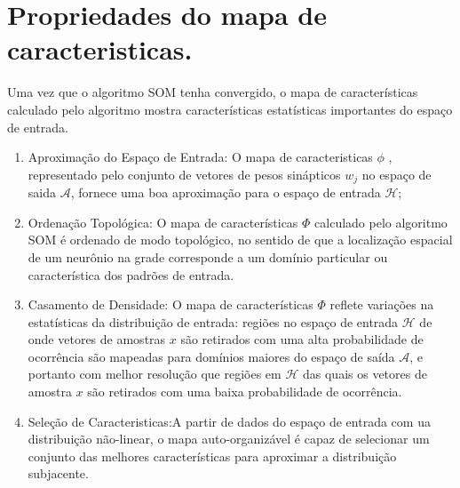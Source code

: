 \section {Propriedades do mapa de caracteristicas.}
	Uma vez que o algoritmo SOM tenha convergido, o mapa de características calculado pelo algoritmo mostra características estatísticas importantes do espaço de entrada.
\begin {enumerate}
\item Aproximação do Espaço de Entrada: O mapa de caracteristicas  $\phi$ , representado pelo conjunto de vetores de pesos sinápticos {$w_j$} no espaço de saida $\mathscr{A}$, fornece uma boa aproximação para o espaço de entrada $\mathscr{H}$;
\item Ordenação Topológica: O mapa de características $\Phi$ calculado pelo algoritmo SOM é ordenado de modo topológico, no sentido de que a localização espacial de um neurônio na grade corresponde a um domínio particular ou característica dos padrões de entrada.
\item Casamento de Densidade: O mapa de características $\Phi$ reflete variações na estatísticas da distribuição de entrada: regiões no espaço de entrada $\mathscr{H}$ de onde vetores de amostras $x$ são retirados com uma alta probabilidade de ocorrência são mapeadas  para domínios maiores do espaço de saída $\mathscr{A}$, e portanto com melhor resolução que regiões em $\mathscr{H}$ das quais os vetores de amostra $x$ são retirados com uma baixa probabilidade de ocorrência.
\item Seleção de Caracteristicas:A partir de dados do espaço de entrada com ua distribuição não-linear, o mapa auto-organizável é capaz de selecionar um conjunto das melhores características para aproximar a distribuição subjacente.
\end{enumerate}





